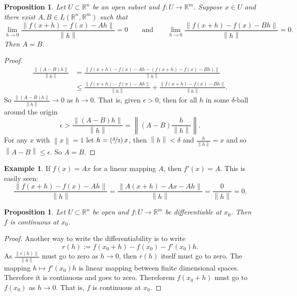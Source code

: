 \documentclass[12pt]{book}
\newcommand{\norm}[1]{\left\lVert {#1} \right\rVert}
\newcommand{\R}{{\mathbb{R}}}
\theoremstyle{plain}
\newtheorem{prop}[thm]{Proposition}
\theoremstyle{remark}
\theoremstyle{definition}
\theoremstyle{exercise}
\theoremstyle{example}
\newtheorem{example}[thm]{Example}
\begin{document}
\begin{prop}
Let $U \subset \R^n$ be an open subset and $f \colon U \to \R^m$.  Suppose
$x \in U$ and there exist 
$A,B \in L(\R^n,\R^m)$ such that
\begin{equation*}
\lim_{h \to 0}
\frac{\norm{f(x+h)-f(x) - Ah}}{\norm{h}} = 0
\qquad \text{and} \qquad
\lim_{h \to 0}
\frac{\norm{f(x+h)-f(x) - Bh}}{\norm{h}} = 0 .
\end{equation*}
Then $A=B$.
\end{prop}

\begin{proof}
\begin{equation*}
\begin{split}
\frac{\norm{(A-B)h}}{\norm{h}} & =
\frac{\norm{f(x+h)-f(x) - Ah - (f(x+h)-f(x) - Bh)}}{\norm{h}} \\
& \leq
\frac{\norm{f(x+h)-f(x) - Ah}}{\norm{h}} + \frac{\norm{f(x+h)-f(x) -
Bh}}{\norm{h}} .
\end{split}
\end{equation*}
So 
$\frac{\norm{(A-B)h}}{\norm{h}} \to 0$ as $h \to 0$.  That is, given
$\epsilon > 0$, then for all $h$ in some $\delta$-ball around
the origin
\begin{equation*}
\epsilon > 
\frac{\norm{(A-B)h}}{\norm{h}}
=
\norm{(A-B)\frac{h}{\norm{h}}} .
\end{equation*}
For any $x$ with $\norm{x}=1$
let $h = (\nicefrac{\delta}{2}) \, x$, then $\norm{h} < \delta$
and $\frac{h}{\norm{h}} = x$ and so $\norm{A-B} \leq \epsilon$.  So
$A = B$.
\end{proof}

\begin{example}
If $f(x) = Ax$ for a linear mapping $A$, then
$f'(x) = A$.  This is easily seen:
\begin{equation*}
\frac{\norm{f(x+h)-f(x) - Ah}}{\norm{h}}
=
\frac{\norm{A(x+h)-Ax - Ah}}{\norm{h}}
=
\frac{0}{\norm{h}} = 0 .
\end{equation*}
\end{example}

\begin{prop}
Let $U \subset \R^n$ be open and $f \colon U \to \R^m$ be
differentiable at $x_0$.  Then $f$ is continuous at $x_0$.
\end{prop}

\begin{proof}
Another way to write the differentiability is to write
\begin{equation*}
r(h) := f(x_0+h)-f(x_0) - f'(x_0) h .
\end{equation*}
As $\frac{\norm{r(h)}}{\norm{h}}$ must go to zero as $h \to 0$, 
then
$r(h)$ itself must go to zero.  The mapping $h \mapsto f'(x_0) h$
is linear mapping between finite dimensional spaces.  Therefore it
is continuous
and goes to zero.  Thereforem
$f(x_0+h)$ must go to $f(x_0)$ as $h \to 0$.  That is, $f$ is continuous at $x_0$.
\end{proof}
\end{document}
